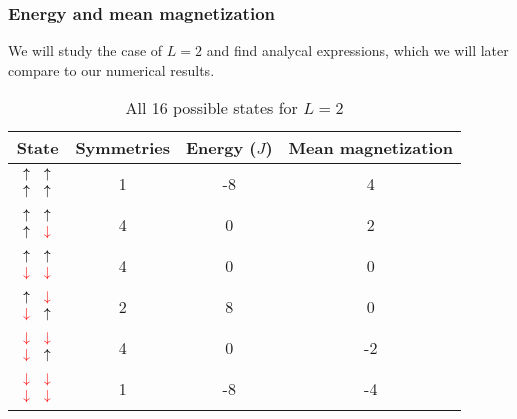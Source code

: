 \documentclass[a4paper]{article}
\begin{document}
\subsubsection{Energy and mean magnetization}

 We will study the case of $L = 2$ and find analycal expressions, which we will later compare to our numerical results.
\begin{table}[htb]
\begin{center}
\begin{tabular}{cccc}
    State & Symmetries & Energy ($J$) & Mean magnetization \\ \hline
    $ \begin{array}{cc}
        \uparrow&\uparrow \\
        \uparrow&\uparrow
    \end{array} $ &
    1 & %
    -8 & %
    4   %
    \\ \hline
    $ \begin{array}{cc}
        \uparrow&\uparrow \\
        \uparrow&{\color{red}\downarrow}
    \end{array} $ &
    4 & %
    0 & %
    2   %
    \\ \hline
    $ \begin{array}{cc}
        \uparrow&\uparrow \\
        {\color{red}\downarrow}&{\color{red}\downarrow}
    \end{array} $ &
    4 & %
    0 & %
    0   %
    \\ \hline
    $ \begin{array}{cc}
        \uparrow&{\color{red}\downarrow} \\
        {\color{red}\downarrow}&\uparrow
    \end{array} $ &
    2 & %
    8 & %
    0   %
    \\ \hline
    $ \begin{array}{cc}
        {\color{red}\downarrow}&{\color{red}\downarrow} \\
        {\color{red}\downarrow}&\uparrow
    \end{array} $ &
    4 & %
    0 & %
    -2   %
    \\ \hline
    $ \begin{array}{cc}
        {\color{red}\downarrow}&{\color{red}\downarrow} \\
        {\color{red}\downarrow}&{\color{red}\downarrow}
    \end{array} $ &
    1 & %
    -8 & %
    -4   %
    \\ \hline
\end{tabular}
\end{center}
\caption{All 16 possible states for $L=2$}
\label{table:states}
\end{table}
\end{document}
